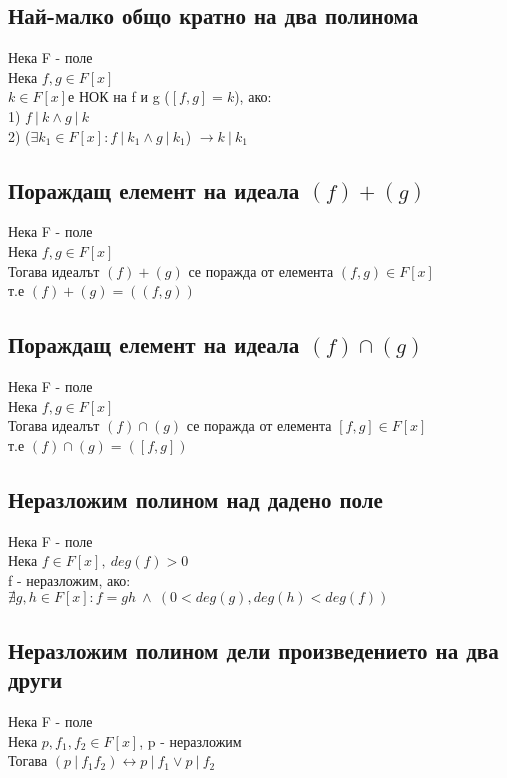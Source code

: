 \documentclass[12pt]{article}
\begin{document}
\subsection{Най-малко общо кратно на два полинома}
Нека F - поле \\
Нека $f,g \in F[x]$ \\
$k \in F[x]$е НОК на f и g ($[f,g] = k$), ако: \\
1) $f \ \vert \ k \land g \ \vert \ k$ \\
2) ($\exists k_1 \in F[x] : f \ \vert \ k_1 \land g \ \vert \ k_1$) $\rightarrow k \ \vert \ k_1$

\subsection{Пораждащ елемент на идеала $(f) + (g)$}
Нека F - поле \\
Нека $f,g \in F[x]$ \\
Тогава идеалът $(f) + (g)$ се поражда от елемента $(f,g) \in F[x]$ \\
т.е  $(f) + (g) = ((f,g))$\\

\subsection{Пораждащ елемент на идеала $(f) \cap (g)$}
Нека F - поле \\
Нека $f,g \in F[x]$ \\
Тогава идеалът $(f) \cap (g)$ се поражда от елемента $[f,g] \in F[x]$ \\
т.е  $(f) \cap (g) = ([f,g])$\\

\subsection{Неразложим полином над дадено поле}
Нека F - поле \\
Нека $f \in F[x],\ deg(f) > 0$ \\
f - неразложим, ако: \\
$ \nexists g,h \in F[x] : f = gh\ \land\ (0 < deg(g),deg(h) < deg(f))$

\subsection{Неразложим полином дели произведението на два други}
Нека F - поле\\
Нека $p,f_1,f_2 \in F[x]$, p - неразложим \\
Тогава $(p \ \vert \ f_1f_2) \leftrightarrow p \ \vert \ f_1 \lor p \ \vert \ f_2$
\end{document}
